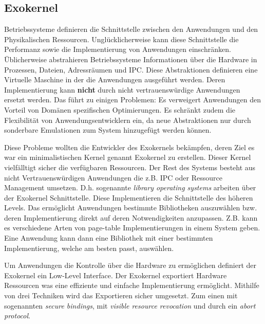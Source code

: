 \documentclass[11pt,technote]{IEEEtran}
\begin{document}
    \subsection{Exokernel}       
      Betriebssysteme definieren die Schnittstelle zwischen den Anwendungen und den Physikalischen Ressourcen.
      Ungl\"ucklicherweise kann diese Schnittstelle die Performanz sowie die Implementierung von Anwendungen einschr\"anken. \"Ublicherweise
      abstrahieren Betriebssysteme Informationen \"uber die Hardware in Prozessen, Dateien, Adressr\"aumen und IPC. Diese Abstraktionen definieren eine 
      Virtuelle Maschine in der die Anwendungen ausgef\"uhrt werden. Deren Implementierung kann \textbf{nicht} durch nicht vertrauensw\"urdige Anwendungen
      ersetzt werden. Das f\"uhrt zu einigen Problemen: Es verweigert Anwendungen den Vorteil von Dom\"anen spezifischen Optimierungen.
      Es schr\"ankt zudem die Flexibilit\"at von Anwendungsentwicklern ein, da neue Abstraktionen nur durch sonderbare Emulationen zum
      System hinzugef\"ugt werden k\"onnen.
        
      Diese Probleme wollten die Entwickler des Exokernels bek\"ampfen, deren Ziel es war ein minimalistischen Kernel genannt Exokernel zu erstellen.
      Dieser Kernel vielf\"alltigt sicher die verf\"ugbaren Ressourcen. Der Rest des Systems besteht aus nicht Vertrauensw\"urdigen Anwendungen die
      z.B. IPC oder Ressource Management umsetzen. D.h. sogenannte \textit{library operating systems} arbeiten \"uber der Exokernel Schnittstelle. 
      Diese Implementieren die Schnittstelle des h\"oheren Levels. Das erm\"oglicht Anwendungen bestimmte Bibliotheken auszuw\"ahlen bzw.
      deren Implementierung direkt auf deren Notwendigkeiten anzupassen. Z.B. kann es verschiedene Arten von page-table Implementierungen
      in einem System geben. Eine Anwendung kann dann eine Bibliothek mit einer bestimmten Implementierung, welche am besten passt, ausw\"ahlen.
        
      Um Anwendungen die Kontrolle \"uber die Hardware zu erm\"oglichen definiert der Exokernel ein Low-Level Interface.
      Der Exokernel exportiert Hardware Ressourcen was eine effiziente und einfache Implementierung erm\"oglicht.
      Mithilfe von drei Techniken wird das Exportieren sicher umgesetzt. Zum einen mit sogenannten \textit{secure bindings}, 
      mit \textit{visible resource revocation} und durch ein \textit{abort protocol}. 
        
\end{document}
